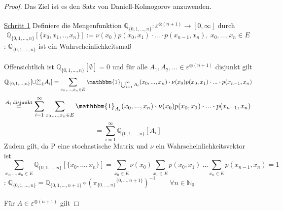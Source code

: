 \documentclass[a4paper,12pt]{scrartcl}
\theoremstyle{definition}
\begin{document}
\begin{proof}
Das Ziel ist es den Satz von Daniell-Kolmogorov anzuwenden.
\\
\\
\underline{Schritt 1} Definiere die Mengenfunktion $\mathbb{Q}_{\lbrace 0,1,...,n \rbrace}: \varepsilon^{ \otimes (n+1)} \to [0, \infty]$ durch 
\begin{equation*}
\mathbb{Q}_{\lbrace 0,1,...,n \rbrace}[\lbrace x_{0},x_{1},..,x_{n} \rbrace] := \nu(x_{0})p(x_{0},x_{1}) \cdot...\cdot p(x_{n-1},x_{n}), \: x_{0},...,x_{n} \in E
\end{equation*}
:  $\mathbb{Q}_{\lbrace 0,1,...,n \rbrace}$ ist ein Wahrscheinlichkeitsmaß
\\
\\
Offensichtlich ist  $\mathbb{Q}_{\lbrace 0,1,...,n \rbrace}[\emptyset] = 0$ und für alle $A_{1},A_{2},... \in \varepsilon^{ \otimes (n+1)}$ disjunkt gilt
\begin{equation*}
\mathbb{Q}_{\lbrace 0,1,...,n \rbrace}[\cup_{i=1}^{\infty}A_{i}] = \sum _{x_{0},...,x_{n} \in E} \mathbbm{1}_{\bigcup_{i=1}^{\infty}A_{i}}(x_{0},...,x_{n}) \cdot \nu(x_{0})p(x_{0},x_{1}) \cdot ... \cdot p(x_{n-1},x_{n})
\end{equation*}
\begin{equation*}
\stackrel{A_{i} \mathrm{\: disjunkt}}{=} \sum_{i=1}^{\infty} \sum _{x_{0},...,x_{n} \in E} \mathbbm{1}_{A_{i}}(x_{0},...,x_{n}) \cdot \nu(x_{0})p(x_{0},x_{1}) \cdot ... \cdot p(x_{n-1},x_{n})
\end{equation*}
\begin{equation*}
= \sum_{i=1}^{\infty} \mathbb{Q}_{\lbrace 0,1,...,n \rbrace}[A_{i}]
\end{equation*}
Zudem gilt, da P eine stochastische Matrix und $\nu$ ein Wahrscheinlichkeitsvektor ist 
\begin{equation*}
\sum_{x_{0},...,x_{n} \in E} \mathbb{Q}_{\lbrace 0,1,...,n \rbrace}[\lbrace x_{0},...,x_{n} \rbrace] = \sum_{x_{0} \in E} \nu(x_{0}) \sum_{x_{1} \in E} p(x_{0},x_{1}) \: ... \sum_{x_{n} \in E}p(x_{n-1},x_{n}) = 1
\end{equation*}
: $\mathbb{Q}_{\lbrace 0,1,...,n \rbrace} = \mathbb{Q}_{\lbrace 0,1,...,n+1 \rbrace} \circ ({\pi_{\lbrace 0,...,n \rbrace}}^{\lbrace 0,...,n+1 \rbrace})^{-1} \qquad \forall n \in \mathbb{N}_{0}$
\\
\\
Für $A \in \varepsilon^{ \otimes (n+1)}$ gilt


\end{proof}
\end{document}
